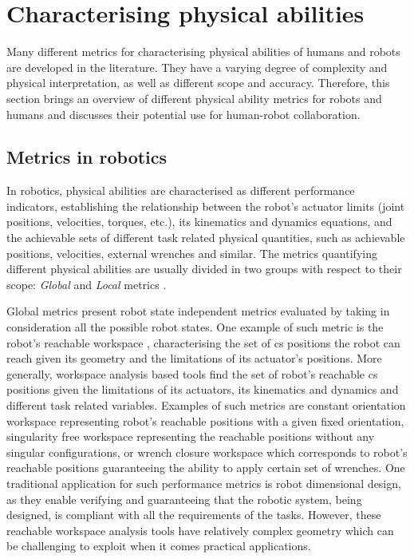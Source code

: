 \section{Characterising physical abilities}
\label{ch:inro_overview}
Many different metrics for characterising physical abilities of humans and robots are developed in the literature. They have a varying degree of complexity and physical interpretation, as well as different scope and accuracy.
Therefore, this section brings an overview of different physical ability metrics for robots and humans and discusses their potential use for human-robot collaboration.

\subsection{Metrics in robotics}
In robotics, physical abilities are characterised as different performance indicators, establishing the relationship between the robot's actuator limits (joint positions, velocities, torques, etc.), its kinematics and dynamics equations, and the achievable sets of different task related physical quantities, such as achievable positions, velocities, external wrenches and similar. The metrics quantifying different physical abilities are usually divided in two groups with respect to their scope: \textit{Global} and \textit{Local} metrics  \cite{russo2022measuring}. 

Global metrics present robot state independent metrics evaluated by taking in consideration all the possible robot states.
One example of such metric is the robot's reachable workspace \cite{Gosselin1991Synthesis,Vahrenkamp2016,kucuk2005robot}, characterising the set of \gls{cs} positions the robot can reach given its geometry and the limitations of its actuator's positions. More generally, workspace analysis based tools find the set of robot's reachable \gls{cs} positions given the limitations of its actuators, its kinematics and dynamics and different task related variables. Examples of such metrics are  constant orientation workspace \cite{Merlet1999Determination} representing robot's reachable positions with a given fixed orientation, singularity free workspace \cite{Jiang2008} representing the reachable positions without any singular configurations, or wrench closure workspace \cite{gouttefarde2006determination,Lau2011} which corresponds to robot's reachable positions guaranteeing the ability to apply certain set of wrenches.
One traditional application for such performance metrics is robot dimensional design, as they enable verifying and guaranteeing that the robotic system, being designed, is compliant with all the requirements of the tasks. 
However, these reachable workspace analysis tools have relatively complex geometry which can be challenging to exploit when it comes practical applications. 

